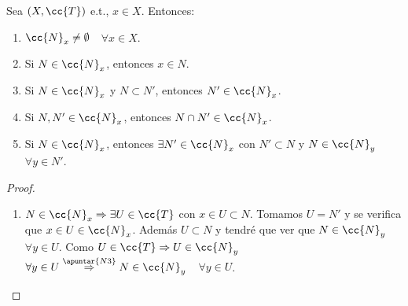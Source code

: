 \begin{prop}
    Sea $(X,\cc{T})$ e.t., $x\in X$. Entonces:
    \begin{enumerate}
        \item[\objetivo{N1}] $\cc{N}_x \neq \emptyset$\ \ $\forall x \in X$.
        \item[\objetivo{N2}] Si $N \in \cc{N}_x$, entonces $x\in N$.
        \item[\objetivo{N3}] Si $N \in \cc{N}_x$ y $N\subset N'$, entonces $N'\in \cc{N}_x$.
        \item[\objetivo{N4}] Si $N,N'\in \cc{N}_x$, entonces $N\cap N' \in \cc{N}_x$.
        \item[\objetivo{N5}] Si $N\in \cc{N}_x$, entonces $\exists N'\in \cc{N}_x$ con $N'\subset N$ y $N\in \cc{N}_y$\ \ $\forall y \in N'$.  
    \end{enumerate}
    \begin{proof}\
        \begin{enumerate}
            \item[\apuntar{N5}] $N\in \cc{N}_x\Rightarrow \exists U \in \cc{T}$ con $x\in U\subset N$. Tomamos $U=N'$ y se verifica que $x\in U \in \cc{N}_x$. Además $U\subset N$ y tendré que ver que $N\in \cc{N}_y$\ \ $\forall y \in U$. Como $U\in \cc{T}\Rightarrow U\in \cc{N}_y$\ \ $\forall y \in U \overset{\apuntar{N3}}{\Rightarrow} N\in \cc{N}_y$\ \ $\forall y \in U$.
        \end{enumerate}
    \end{proof}
\end{prop}

